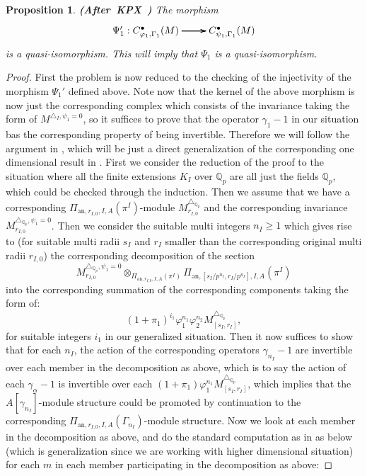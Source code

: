 \documentclass[12pt]{amsart}
\newtheorem{proposition}[theorem]{Proposition}
\theoremstyle{definition}
\numberwithin{equation}{section}
\begin{document}
\begin{proposition} \mbox{\bf{(After KPX \cite[Proposition 2.3.6,Lemma 3.1.2]{KPX})}}
The morphism  
\[
\xymatrix@R+0pc@C+0pc{
\Psi_1': C^\bullet_{\varphi_1,\Gamma_1}(M) \ar[r] \ar[r] \ar[r]  & C^\bullet_{\psi_1,\Gamma_1}(M)
}
\]
is a quasi-isomorphism. This will imply that $\Psi_1$ is a quasi-isomorphism.	
\end{proposition}

\begin{proof}
First the problem is now reduced to the checking of the injectivity of the morphism $\Psi_1'$ defined above. Note now that the kernel of the above morphism is now just the corresponding complex which consists of the invariance taking the form of $M^{\triangle_I,\psi_1=0}$, so it suffices to prove that the operator $\gamma_1-1$ in our situation bas the corresponding property of being invertible. Therefore we will follow the argument in \cite[Proposition 2.3.6]{KPX}, which will be just a direct generalization of the corresponding one dimensional result in \cite[Proposition 2.3.6]{KPX}. First we consider the reduction of the proof to the situation where all the finite extensions $K_I$ over $\mathbb{Q}_p$ are all just the fields $\mathbb{Q}_p$, which could be checked through the induction. Then we assume that we have a corresponding $\Pi_{\mathrm{an},r_{I,0},I,A}(\pi^I)$-module $M_{r_{I,0}}^{\triangle_{\mathbb{Q}_p}}$ and the corresponding invariance $M_{r_{I,0}}^{\triangle_{\mathbb{Q}_p},\psi_1=0}$.
Then we consider the suitable multi integers $n_I\geq 1$ which gives rise to (for suitable multi radii $s_I$ and $r_I$ smaller than the corresponding original multi radii $r_{I,0}$) the corresponding decomposition of the section 
\begin{displaymath}
M_{r_{I,0}}^{\triangle_{\mathbb{Q}_p},\psi_1=0}\otimes_{\Pi_{\mathrm{an},r_{I,0},I,A}(\pi^I)} \Pi_{\mathrm{an},[s_I/p^{n_I},r_I/p^{n_I}],I,A}(\pi^I)	
\end{displaymath}
into the corresponding summation of the corresponding components taking the form of:
\begin{displaymath}
(1+\pi_1)^{i_1}\varphi_1^{n_1}\varphi_2^{n_2}M_{[s_I,r_I]}^{\triangle_{\mathbb{Q}_p}},	
\end{displaymath}
for suitable integers $i_1$ in our generalized situation. Then it now suffices to show that for each $n_I$, the action of the corresponding operators $\gamma_{n_I}-1$ are invertible over each member in the decomposition as above, which is to say the action of each $\gamma_\alpha-1$ is invertible over each $(1+\pi_1)\varphi_1^{n_1}M_{[s_I,r_I]}^{\triangle_{\mathbb{Q}_p}}$, which implies that the $A[\gamma_{n_I}]$-module structure could be promoted by continuation to the corresponding $\Pi_{\mathrm{an},r_{I,0},I,A}(\Gamma_{n_I})$-module structure. Now we look at each member in the decomposition as above, and do the standard computation as in \cite[Lemma 3.1.2]{KPX} as below (which is generalization since we are working with higher dimensional situation) for each $m$ in each member participating in the decomposition as above:

\end{proof}
\end{document}

